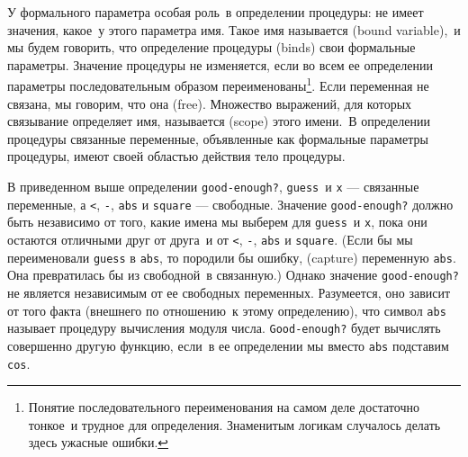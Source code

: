 У формального параметра особая роль~в определении
процедуры: не имеет значения, какое~у этого
параметра имя. Такое имя называется
 (bound variable),~и мы будем говорить, что
определение процедуры
 (binds) свои
формальные параметры.  Значение процедуры не изменяется, если во всем
ее определении параметры последовательным образом переименованы\footnote{Понятие последовательного переименования на самом
деле достаточно тонкое~и трудное для определения.  Знаменитым логикам
случалось делать здесь ужасные ошибки.
}.
Если переменная не связана, мы говорим, что она 
 (free).
Множество выражений, для которых связывание определяет имя, называется
 (scope) этого имени.~В 
определении процедуры связанные переменные, объявленные как
формальные параметры процедуры, имеют своей областью действия тело процедуры.

В приведенном выше определении {\tt good-enough?}, 
{\tt guess}~и {\tt x} --- связанные переменные, а
{\tt <}, {\tt -}, {\tt abs} и
{\tt square} --- свободные.  Значение {\tt good-enough?} 
должно быть независимо от того, какие имена мы выберем для
{\tt guess}~и {\tt x}, пока они остаются отличными друг 
от друга~и от {\tt <}, {\tt -}, {\tt abs} и
{\tt square}. (Если бы мы переименовали {\tt guess} в
{\tt abs}, то породили бы
ошибку,
 (capture) переменную {\tt abs}. Она
превратилась бы из свободной~в связанную.)  Однако значение
{\tt good-enough?} не является независимым от ее свободных
переменных.  Разумеется, оно зависит от того факта (внешнего по
отношению~к этому определению), что символ {\tt abs} называет
процедуру вычисления модуля числа.  {\tt Good-enough?} будет
вычислять совершенно другую функцию, если~в ее определении мы вместо
{\tt abs} подставим {\tt cos}.

